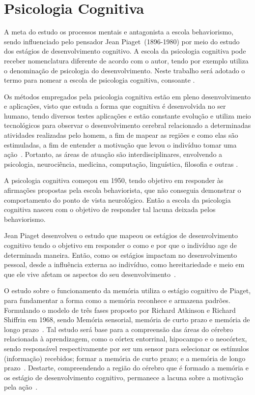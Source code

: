 \section{Psicologia Cognitiva}\label{cognitivismo}

A meta do estudo os processos mentais e antagonista a escola behaviorismo, sendo influenciado pelo pensador Jean Piaget~(1896-1980) por meio do estudo dos estágios de desenvolvimento cognitivo. 
A escola da psicologia cognitiva pode receber nomenclatura diferente de acordo com o autor, tendo por exemplo   utiliza o denominação de psicologia do desenvolvimento. 
Neste trabalho será adotado o termo para nomear a escola de psicologia cognitiva, consoante .

Os métodos empregados pela psicologia cognitiva estão em pleno desenvolvimento e aplicações, visto que estuda a forma que cognitiva é desenvolvida no ser humano, tendo diversos testes aplicações e estão constante evolução e utiliza meio tecnológicos para observar o desenvolvimento cerebral relacionado a determinadas atividades realizadas pelo homem, a fim de mapear as regiões e como elas são estimuladas, a fim de entender a motivação que levou o indivíduo tomar uma ação~\cite{nicolelis2015cerebro}. 
Portanto, as áreas de atuação são interdisciplinares, envolvendo a psicologia, neurociência, medicina, computação, linguística, filosofia e outras \cite{eysenck2017psi_cognitiva}.

A psicologia cognitiva começou em 1950, tendo objetivo em responder às afirmações propostas pela escola behaviorista, que não conseguia demonstrar o comportamento do ponto de vista neurológico.
Então a escola da psicologia cognitiva nasceu com o objetivo de responder tal lacuna deixada pelos behaviorismo.

Jean Piaget desenvolveu o estudo que mapeou os estágios de desenvolvimento cognitivo tendo o objetivo em responder o como e por que o indivíduo age de determinada maneira.
Então, como os estágios impactam no desenvolvimento pessoal, desde a influência externa ao indivíduo, como hereitariedade e meio em que ele vive afetam os aspectos do seu desenvolvimento~\cite{bock1999psicologias}. 

O estudo sobre o funcionamento da memória utiliza o estágio cognitivo de Piaget, para fundamentar a forma como a memória reconhece e armazena padrões.
Formulando o modelo de três fases proposto por Richard Atkinson e Richard Shiffrin em 1968, sendo Memória sensorial, memória de curto prazo e memória de longo prazo~\cite{laruse2009geral}.
Tal estudo será base para a compreensão das áreas do cérebro relacionada à aprendizagem, como o córtex entorrinal, hipocampo e o neocórtex, sendo responsável respectivamente por ser um sensor para selecionar os estímulos (informação) recebidos; formar a memória de curto prazo; e a memória de longo prazo~\cite{carey2014aprendemos}.
Destarte, compreendendo a região do cérebro que é formado a memória e os estágio de desenvolvimento cognitivo, permanece a lacuna sobre a motivação pela ação~\cite{sternberg2000psicologia}.

